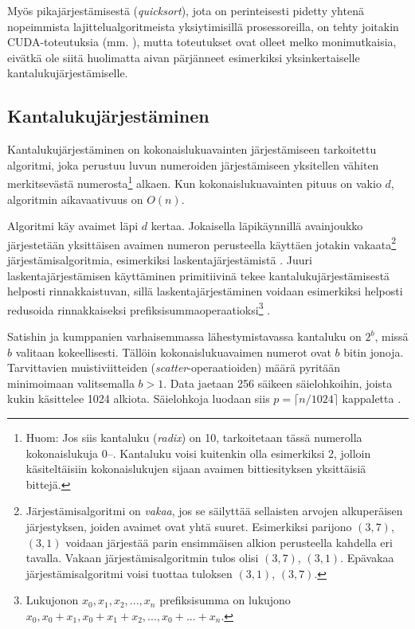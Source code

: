 \documentclass[a4paper,11pt]{article}
\newcommand{\engl}[1]{\foreignlanguage{english}{\em #1}}
\begin{document}
Myös pikajärjestämisestä (\engl{quicksort}), jota on perinteisesti pidetty yhtenä nopeimmista lajittelualgoritmeista yksiytimisillä prosessoreilla, on tehty joitakin CUDA-toteutuksia (mm. \cite{cederman2009}), mutta toteutukset ovat olleet melko monimutkaisia, eivätkä ole siitä huolimatta aivan pärjänneet esimerkiksi yksinkertaiselle kantalukujärjestämiselle.

\subsection{Kantalukujärjestäminen}

Kantalukujärjestäminen on kokonaislukuavainten järjestämiseen tarkoitettu algoritmi, joka perustuu luvun numeroiden järjestämiseen yksitellen vähiten merkitsevästä numerosta\footnote{Huom: Jos siis kantaluku (\engl{radix}) on 10, tarkoitetaan tässä numerolla kokonaislukuja 0\thinspace--. Kantaluku voisi kuitenkin olla esimerkiksi 2, jolloin käsiteltäisiin kokonaislukujen sijaan avaimen bittiesityksen yksittäisiä bittejä.} alkaen. Kun kokonaislukuavainten pituus on vakio $d$, algoritmin aikavaativuus on $O(n)$.

Algoritmi käy avaimet läpi $d$ kertaa. Jokaisella läpikäynnillä avainjoukko järjestetään yksittäisen avaimen numeron perusteella käyttäen jotakin vakaata\footnote{Järjestämisalgoritmi on \emph{vakaa}, jos se säilyttää sellaisten arvojen alkuperäisen järjestyksen, joiden avaimet ovat yhtä suuret. Esimerkiksi parijono $(3, 7)$, $(3, 1)$ voidaan järjestää parin ensimmäisen alkion perusteella kahdella eri tavalla. Vakaan järjestämisalgoritmin tulos olisi $(3, 7)$, $(3, 1)$. Epävakaa järjestämisalgoritmi voisi tuottaa tuloksen $(3, 1)$, $(3, 7)$.} järjestämisalgoritmia, esimerkiksi laskentajärjestämistä \cite{clrs}. Juuri laskentajärjestämisen käyttäminen primitiivinä tekee kantalukujärjestämisestä helposti rinnakkaistuvan, sillä laskentajärjestäminen voidaan esimerkiksi helposti redusoida rinnakkaiseksi prefiksisummaoperaatioksi\footnote{Lukujonon $x_0, x_1, x_2, ..., x_n$ prefiksisumma on lukujono $x_0, x_0 + x_1, x_0 + x_1 + x_2, ..., x_0 + ... + x_n$.} \cite{satish2009}.

Satishin ja kumppanien \cite{satish2009} varhaisemmassa lähestymistavassa kantaluku on $2^b$, missä $b$ valitaan kokeellisesti. Tällöin kokonaislukuavaimen numerot ovat $b$ bitin jonoja. Tarvittavien muistiviitteiden (\engl{scatter}-operaatioiden) määrä pyritään minimoimaan valitsemalla $b > 1$. Data jaetaan 256 säikeen säielohkoihin, joista kukin käsittelee 1024 alkiota. Säielohkoja luodaan siis $p = \lceil n/1024 \rceil$ kappaletta \cite{satish2009}.
\end{document}
